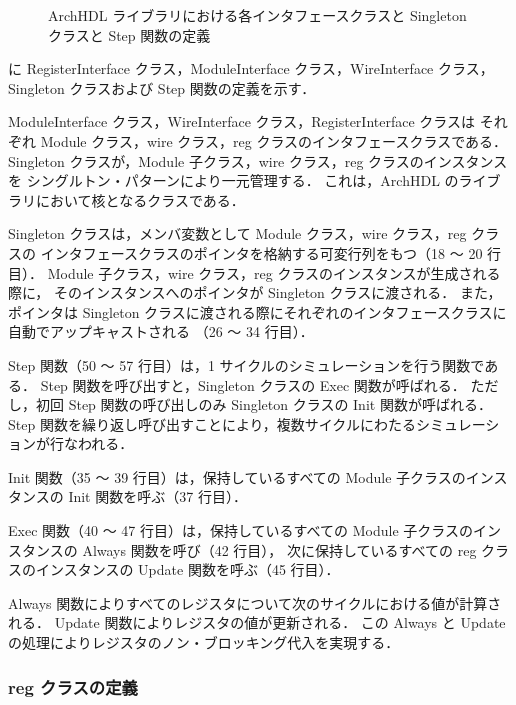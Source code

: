 \begin{figure}[t]
 
 \caption{ArchHDL ライブラリにおける各インタフェースクラスと Singleton クラスと Step 関数の定義}
 \label{src:class_singleton}
\end{figure}

 に RegisterInterface クラス，ModuleInterface クラス，WireInterface クラス，
Singleton クラスおよび Step 関数の定義を示す．

ModuleInterface クラス，WireInterface クラス，RegisterInterface クラスは
それぞれ Module クラス，wire クラス，reg クラスのインタフェースクラスである．
Singleton クラスが，Module 子クラス，wire クラス，reg クラスのインスタンスを
シングルトン・パターンにより一元管理する．
これは，ArchHDL のライブラリにおいて核となるクラスである．

Singleton クラスは，メンバ変数として Module クラス，wire クラス，reg クラスの
インタフェースクラスのポインタを格納する可変行列をもつ（18 ～ 20 行目）．
Module 子クラス，wire クラス，reg クラスのインスタンスが生成される際に，
そのインスタンスへのポインタが Singleton クラスに渡される．
また，ポインタは Singleton クラスに渡される際にそれぞれのインタフェースクラスに自動でアップキャストされる
（26 ～ 34 行目）．

Step 関数（50 ～ 57 行目）は，1 サイクルのシミュレーションを行う関数である．
Step 関数を呼び出すと，Singleton クラスの Exec 関数が呼ばれる．
ただし，初回 Step 関数の呼び出しのみ Singleton クラスの Init 関数が呼ばれる．
Step 関数を繰り返し呼び出すことにより，複数サイクルにわたるシミュレーションが行なわれる．

Init 関数（35 ～ 39 行目）は，保持しているすべての Module 子クラスのインスタンスの Init 関数を呼ぶ（37 行目）．

Exec 関数（40 ～ 47 行目）は，保持しているすべての Module 子クラスのインスタンスの Always 関数を呼び（42 行目），
次に保持しているすべての reg クラスのインスタンスの Update 関数を呼ぶ（45 行目）．

Always 関数によりすべてのレジスタについて次のサイクルにおける値が計算される．
Update 関数によりレジスタの値が更新される．
この Always と Update の処理によりレジスタのノン・ブロッキング代入を実現する．


\subsubsection{reg クラスの定義}

